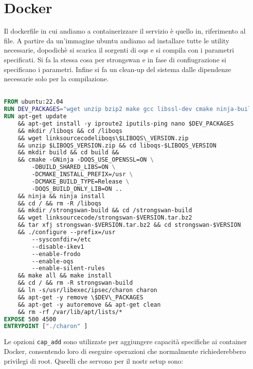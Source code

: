 \newpage

\section{Docker}

Il dockerfile in cui andiamo a containerizzare il servizio è quello in, riferimento al file.
A partire da un'immagine ubuntu andiamo ad installare tutte le utility necessarie, dopodichè 
si scarica il sorgenti di oqs e si compila con i parametri specificati.
Si fa la stessa cosa per strongswan e in fase di confiugrazione si specificano i parametri.
Infine si fa un clean-up del sistema dalle dipendenze necessarie solo per la compilazione.

\begin{lstlisting}[language=Dockerfile]

FROM ubuntu:22.04
RUN DEV_PACKAGES="wget unzip bzip2 make gcc libssl-dev cmake ninja-build"
RUN apt-get update 
    && apt-get install -y iproute2 iputils-ping nano $DEV_PACKAGES 
    && mkdir /liboqs && cd /liboqs 
    && wget linksourcecodeliboqs\$LIBOQS\_VERSION.zip 
    && unzip $LIBOQS_VERSION.zip && cd liboqs-$LIBOQS_VERSION 
    && mkdir build && cd build &&
    && cmake -GNinja -DOQS_USE_OPENSSL=ON \
        -DBUILD_SHARED_LIBS=ON \
        -DCMAKE_INSTALL_PREFIX=/usr \
        -DCMAKE_BUILD_TYPE=Release \
        -DOQS_BUILD_ONLY_LIB=ON .. 
    && ninja && ninja install 
    && cd / && rm -R /liboqs 
    && mkdir /strongswan-build && cd /strongswan-build 
    && wget linksourcecode/strongswan-$VERSION.tar.bz2 
    && tar xfj strongswan-$VERSION.tar.bz2 && cd strongswan-$VERSION 
    && ./configure --prefix=/usr
        --sysconfdir=/etc 
        --disable-ikev1 
        --enable-frodo 
        --enable-oqs
        --enable-silent-rules 
    && make all && make install 
    && cd / && rm -R strongswan-build 
    && ln -s/usr/libexec/ipsec/charon charon 
    && apt-get -y remove \$DEV\_PACKAGES 
    && apt-get -y autoremove && apt-get clean 
    && rm -rf /var/lib/apt/lists/*
EXPOSE 500 4500
ENTRYPOINT ["./charon" ]
\end{lstlisting}

\noindent
Le opzioni \texttt{cap\_add} sono utilizzate per aggiungere capacità specifiche ai container
Docker, consentendo loro di eseguire operazioni che normalmente richiederebbero
privilegi di root. Queelli che servono per il nostr setup sono:

